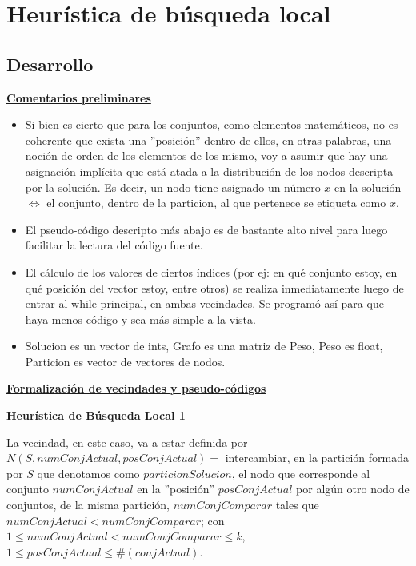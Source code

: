 \documentclass[10pt,a4paper]{article}
\begin{document}
\section{Heurística de búsqueda local}
\subsection{Desarrollo}
\noindent \textbf{\underline{Comentarios preliminares}}
\hfill \newline
\begin{itemize}
\item Si bien es cierto que para los conjuntos, como elementos matemáticos, no es coherente que exista una ''posición'' dentro de ellos, en otras palabras, una noción de orden de los elementos de los mismo, voy a asumir que hay una asignación implícita que está atada a la distribución de los nodos descripta por la solución. Es decir, un nodo tiene asignado un número $x$ en la solución $\iff$ el conjunto, dentro de la particion, al que pertenece se etiqueta como $x$.
\item El pseudo-código descripto más abajo es de bastante alto nivel para luego facilitar la lectura del código fuente.
\item El cálculo de los valores de ciertos índices (por ej: en qué conjunto estoy, en qué posición del vector estoy, entre otros) se realiza inmediatamente luego de entrar al while principal, en ambas vecindades. Se programó así para que haya menos código y sea más simple a la vista.
\item Solucion es un vector de ints, Grafo es una matriz de Peso, Peso es float, Particion es vector de vectores de nodos. 
\end{itemize}
\hfill \newline
\textbf{\underline{Formalización de vecindades y pseudo-códigos}}
\hfill \newline

\textbf{Heurística de Búsqueda Local 1}

La vecindad, en este caso, va a estar definida por $N(S, numConjActual, posConjActual) = $ intercambiar, en la partición formada por $S$ que denotamos como $particionSolucion$, el nodo que corresponde al conjunto $numConjActual$ en la ''posición'' $posConjActual$ por algún otro nodo de conjuntos, de la misma partición, $numConjComparar$ tales que $numConjActual < numConjComparar$; \newline con $1 \leq numConjActual < numConjComparar \leq k$, $1 \leq posConjActual \leq \#(conjActual)$. 
\end{document}
